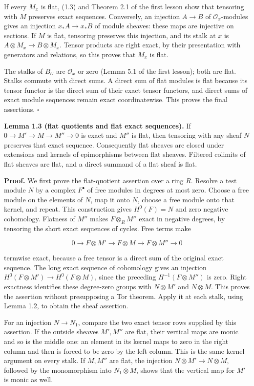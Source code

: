 \documentclass[
  english,
  11pt,
  a4paper,
]{article}
\begin{document}
If every \(M_x\) is flat, (1.3) and Theorem 2.1 of the first lesson show
that tensoring with \(M\) preserves exact sequences. Conversely, an
injection \(A\to B\) of \(\mathcal O_x\)-modules gives an injection
\(x_*A\to x_*B\) of module sheaves: these maps are injective on
sections. If \(M\) is flat, tensoring preserves this injection, and its
stalk at \(x\) is \(A\otimes M_x\to B\otimes M_x\). Tensor products are
right exact, by their presentation with generators and relations, so
this proves that \(M_x\) is flat.

The stalks of \(B_U\) are \(\mathcal O_x\) or zero (Lemma 5.1 of the
first lesson); both are flat. Stalks commute with direct sums. A direct
sum of flat modules is flat because its tensor functor is the direct sum
of their exact tensor functors, and direct sums of exact module
sequences remain exact coordinatewise. This proves the final assertions.
\(\square\)

\textbf{Lemma 1.3 (flat quotients and flat exact sequences).} If
\(0\to M'\to M\to M''\to0\) is exact and \(M''\) is flat, then tensoring
with any sheaf \(N\) preserves that exact sequence. Consequently flat
sheaves are closed under extensions and kernels of epimorphisms between
flat sheaves. Filtered colimits of flat sheaves are flat, and a direct
summand of a flat sheaf is flat.

\textbf{Proof.} We first prove the flat-quotient assertion over a ring
\(R\). Resolve a test module \(N\) by a complex \(F^\bullet\) of free
modules in degrees at most zero. Choose a free module on the elements of
\(N\), map it onto \(N\), choose a free module onto that kernel, and
repeat. This construction gives \(H^0(F)=N\) and zero negative
cohomology. Flatness of \(M''\) makes \(F\otimes_R M''\) exact in
negative degrees, by tensoring the short exact sequences of cycles. Free
terms make

\[0\to F\otimes M'\to F\otimes M\to F\otimes M''\to0\]

termwise exact, because a free tensor is a direct sum of the original
exact sequence. The long exact sequence of cohomology gives an injection
\(H^0(F\otimes M')\to H^0(F\otimes M)\), since the preceding
\(H^{-1}(F\otimes M'')\) is zero. Right exactness identifies these
degree-zero groups with \(N\otimes M'\) and \(N\otimes M\). This proves
the assertion without presupposing a Tor theorem. Apply it at each
stalk, using Lemma 1.2, to obtain the sheaf assertion.

For an injection \(N\to N_1\), compare the two exact tensor rows
supplied by this assertion. If the outside sheaves \(M',M''\) are flat,
their vertical maps are monic and so is the middle one: an element in
its kernel maps to zero in the right column and then is forced to be
zero by the left column. This is the same kernel argument on every
stalk. If \(M,M''\) are flat, the injection
\(N\otimes M'\to N\otimes M\), followed by the monomorphism into
\(N_1\otimes M\), shows that the vertical map for \(M'\) is monic as
well.
\end{document}

